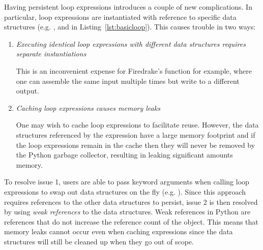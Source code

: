 Having persistent loop expressions introduces a couple of new complications.
In particular, loop expressions are instantiated with reference to specific data structures (e.g. ,  and  in Listing~\ref{lst:basicloop}). 
This causes trouble in two ways:

\begin{enumerate}
  \item
    \textit{Executing identical loop expressions with different data structures requires separate instantiations}

    This is an inconvenient expense for Firedrake's  function for example, where one can assemble the same input multiple times but write to a different output.

  \item
    \textit{Caching loop expressions causes memory leaks}

    One may wish to cache loop expressions to facilitate reuse.
    However, the data structures referenced by the expression have a large memory footprint and if the loop expressions remain in the cache then they will never be removed by the Python garbage collector, resulting in leaking significant amounts memory.
\end{enumerate}

To resolve issue 1, users are able to pass keyword arguments when calling  loop expressions to swap out data structures on the fly (e.g. ).
Since this approach requires references to the other data structures to persist, issue 2 is then resolved by using \textit{weak references} to the data structures.
Weak references in Python are references that do not increase the reference count of the object.
This means that memory leaks cannot occur even when caching expressions since the data structures will still be cleaned up when they go out of scope.
